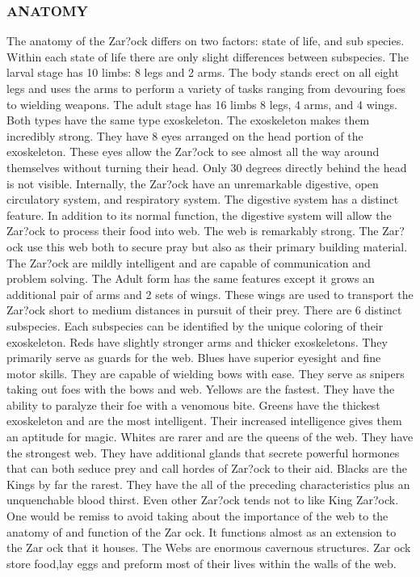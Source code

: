 \subsubsection{ANATOMY}
The anatomy of the Zar?ock differs on two factors: state of life, and sub
species.  Within each state of life there are only slight differences between
subspecies.  The larval stage has 10 limbs: 8 legs and 2 arms.  The body stands
erect on all eight legs and uses the arms to perform a variety of tasks ranging
from devouring foes to wielding weapons.  The adult stage has 16 limbs 8 legs,
4 arms, and 4 wings.  Both types have the same type exoskeleton.  The
exoskeleton makes them incredibly strong.  They have 8 eyes arranged on the
head portion of the exoskeleton.  These eyes allow the Zar?ock to see almost
all the way around themselves without turning their head.  Only 30 degrees
directly behind the head is not visible.  Internally, the Zar?ock have an
unremarkable digestive, open circulatory system, and respiratory system.  The
digestive system has a distinct feature.  In addition to its normal function,
the digestive system will allow the Zar?ock to process their food into web.
The web is remarkably strong.  The Zar?ock use this web both to secure pray but
also as their primary building material.  The Zar?ock are mildly intelligent
and are capable of communication and problem solving. The Adult form has the
same features except it grows an additional pair of arms and 2 sets of wings.
These wings are used to transport the Zar?ock short to medium distances in
pursuit of their prey.  There are 6 distinct subspecies.  Each subspecies can
be identified by the unique coloring of their exoskeleton.  Reds have slightly
stronger arms and thicker exoskeletons.  They primarily serve as guards for the
web.  Blues have superior eyesight and fine motor skills.  They are capable of
wielding bows with ease.  They serve as snipers taking out foes with the bows
and web.  Yellows are the fastest.  They have the ability to paralyze their foe
with a venomous bite.  Greens have the thickest exoskeleton and are the most
intelligent.  Their increased intelligence gives them an aptitude for magic.
Whites are rarer and are the queens of the web.  They have the strongest web.
They have additional glands that secrete powerful hormones that can both seduce
prey and call hordes of Zar?ock to their aid.  Blacks are the Kings by far the
rarest.  They have the all of the preceding characteristics plus an
unquenchable blood thirst.  Even other Zar?ock tends not to like King Zar?ock.
    One would be remiss to avoid taking about the importance of the web to the
    anatomy of and function of the Zar ock.  It functions almost as an
    extension to the Zar ock that it houses.  The Webs are enormous cavernous
    structures.  Zar ock store food,lay eggs and preform most of their lives
    within the walls of the web.
